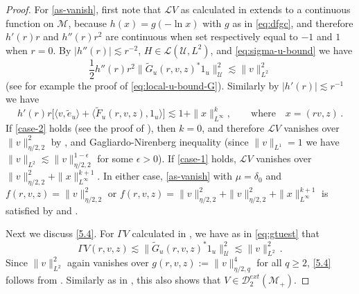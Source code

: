 \documentclass[final]{amsart}
\numberwithin{thm}{section}
\numberwithin{equation}{section}
\newcommand{\U}{\mathcal{U}}
\newcommand{\mcM}{\mathcal{M}}
\newcommand{\inv}{\mathcal{M}_+}
\newcommand{\Dme}{\mathcal{D}^{ext}}
\newcommand{\Ll}{\mathcal{L}}
\newcommand{\ip}[2]{\langle #1, #2 \rangle}
\begin{document}
\begin{proof}
    For \ref{as-vanish}, first note that $\Ll V$ as calculated in  extends to a continuous function on $\mcM$, because $h(x) = g(-\ln x)$ with $g$ as in \eqref{eq:dfgc}, and therefore  $h'(r)r$ and $h''(r)r^2$ are continuous when set respectively equal to $-1$ and $1$ when $r = 0$. By $|h''(r)| \lesssim r^{-2}$, $H \in \Ll(\U,L^2)$, and \eqref{eq:sigma-u-bound} we have
    \begin{equation}\label{eq:gtuest}
    \frac{1}{2}h''(r)r^2\|\tilde G_u(r,v,z)^*1_u\|_\U^2 \lesssim \|v\|_{L^2}^2    
    \end{equation}
    (see for example the proof of \eqref{eq:local-u-bound-G}). Similarly by $|h'(r)| \lesssim r^{-1}$ we have
    $$h'(r)r\Big[\ip{v}{\tilde e_u} + \ip{\tilde F_u(r,v,z)}{1_u}\Big] \lesssim 1 + \|x\|_{L^\infty}^k, 
    \qquad \textrm{where} \quad x = (rv, z)\,.$$
    If \ref{case-2} holds (see the proof of ), then $k = 0$, and therefore $\Ll V$ vanishes over $\|v\|_{\eta/2,2}^2$ by ,  and Gagliardo-Nirenberg inequality (since $\|v\|_{L^1} = 1$ we have $\|v\|_{L^2} \lesssim \|v\|_{\eta/2,2}^{1-\epsilon}$ for some $\epsilon > 0$). If \ref{case-1} holds, $\Ll V$ vanishes over $\|v\|_{\eta/2,2}^2 + \|x\|_{L^\infty}^{k+1}$. In either case, \ref{as-vanish} with $\mu = \delta_0$ and $f(r, v, z) = \|v\|^2_{\eta/2, 2} $ or $f(r, v, z) = \|v\|^2_{\eta/2, 2} + \|v\|_{\eta/2,2}^2 + \|x\|_{L^\infty}^{k+1}$ is satisfied by  and .



    Next we discuss \ref{5.4}. For $\Gamma V$ calculated in 
    , we have as in \eqref{eq:gtuest} that 
    $$\Gamma V(r,v,z) \lesssim \|\tilde G_u(r,v,z)^*1_u\|_\U^2 \lesssim \|v\|_{L^2}^2 \,.$$
    Since $\|v\|_{L^2}^2$ again vanishes over $g(r, v, z) := \|v\|_{\eta/2,q}^4$ for all $q \geq 2$, \ref{5.4} follows from . Similarly as in , this also shows that $V \in \Dme_2(\inv)$.



\end{proof}
\end{document}
